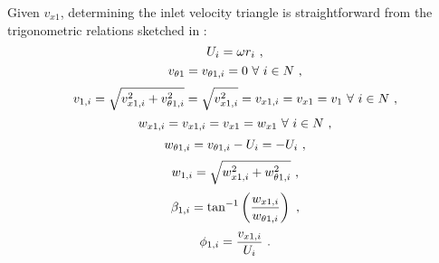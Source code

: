 Given $v_{x1}$, determining the inlet velocity triangle is straightforward from the trigonometric relations sketched in :
\begin{equation}{\label{eq:tangential_velocity}}
	U_{i} = \omega{r_{i}} \ ,
\end{equation}
\begin{equation}{\label{eq:upstream_tangential_component_of_absolute_velocity}}
	v_{\theta1}=v_{\theta1,i} = 0 \ \forall \ i\in{N} \ ,
\end{equation}
\begin{equation}{\label{eq:upstream_absolute_velocity}}
	v_{1,i} = \sqrt{v_{x1,i}^{2} + v_{\theta1,i}^{2}} = \sqrt{v_{x1,i}^{2}} = v_{x1,i} = v_{x1} = v_{1} \ \forall \ i\in{N} \ ,
\end{equation}
\begin{equation}{\label{eq:upstream_axial_component_of_relative_velocity}}
	w_{x1,i} = v_{x1,i} = v_{x1} = w_{x1} \ \forall \ i\in{N} \ ,
\end{equation}
\begin{equation}{\label{eq:upstream_tangential_component_of_relative_velocity}}
	w_{\theta1,i} = v_{\theta1,i} - U_{i} = -U_{i} \ ,
\end{equation}
\begin{equation}{\label{eq:upstream_relative_velocity}}
	w_{1,i} = \sqrt{w_{x1,i}^{2} + w_{\theta1,i}^{2}} \ ,
\end{equation}
\begin{equation}{\label{eq:upstream_beta_angle}}
	\beta_{1,i} = \tan^{-1}\left(\frac{w_{x1,i}}{w_{\theta1,i}}\right) \ ,
\end{equation}
\begin{equation}{\label{eq:upstream_phi}}
	\phi_{1,i} = \frac{v_{x1,i}}{U_{i}} \ .
\end{equation}
